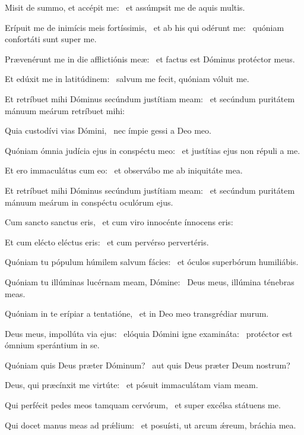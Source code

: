 
\item Misit de summo, et accépit me:~\psstar{} et assúmpsit me de aquis multis.

\item Erípuit me de inimícis meis fortíssimis,~\pscross{} et ab his qui odérunt me:~\psstar{} quóniam confortáti sunt super me.

\item Prævenérunt me in die afflictiónis meæ:~\psstar{} et factus est Dóminus protéctor meus.

\item Et edúxit me in latitúdinem:~\psstar{} salvum me fecit, quóniam vóluit me.

\item Et retríbuet mihi Dóminus secúndum justítiam meam:~\psstar{} et secúndum puritátem mánuum meárum retríbuet mihi:

\item Quia custodívi vias Dómini,~\psstar{} nec ímpie gessi a Deo meo.

\item Quóniam ómnia judícia ejus in conspéctu meo:~\psstar{} et justítias ejus non répuli a me.

\item Et ero immaculátus cum eo:~\psstar{} et observábo me ab iniquitáte mea.

\item Et retríbuet mihi Dóminus secúndum justítiam meam:~\psstar{} et secúndum puritátem mánuum meárum in conspéctu oculórum ejus.

\item Cum sancto sanctus eris,~\psstar{} et cum viro innocénte ínnocens eris:

\item Et cum elécto eléctus eris:~\psstar{} et cum pervérso pervertéris.

\item Quóniam tu pópulum húmilem salvum fácies:~\psstar{} et óculos superbórum humiliábis.

\item Quóniam tu illúminas lucérnam meam, Dómine:~\psstar{} Deus meus, illúmina ténebras meas.

\item Quóniam in te erípiar a tentatióne,~\psstar{} et in Deo meo transgrédiar murum.

\item Deus meus, impollúta via ejus:~\pscross{} elóquia Dómini igne examináta:~\psstar{} protéctor est ómnium sperántium in se.

\item Quóniam quis Deus præter Dóminum?~\psstar{} aut quis Deus præter Deum nostrum?

\item Deus, qui præcínxit me virtúte:~\psstar{} et pósuit immaculátam viam meam.

\item Qui perfécit pedes meos tamquam cervórum,~\psstar{} et super excélsa státuens me.

\item Qui docet manus meas ad prǽlium:~\psstar{} et posuísti, ut arcum ǽreum, bráchia mea.
